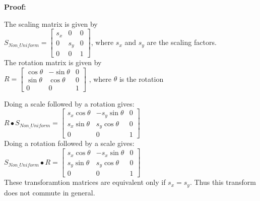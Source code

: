 \documentclass[a4paper,10pt]{scrartcl}
\begin{document}
{\bfseries Proof:}

The scaling matrix is given by \\

$S_{Non\_Uniform} = \begin{bmatrix}
    s_x       & 0 & 0 \\
    0       & s_y & 0 \\
    0       & 0 & 1     
 \end{bmatrix}
$, where $s_x$ and $s_y$ are the scaling factors. \\

The rotation matrix is given by \\

$R = \begin{bmatrix}
      \cos{\theta}       & -\sin{\theta} & 0 \\
      \sin{\theta}       & \cos{\theta} & 0 \\
      0       & 0 & 1             
     \end{bmatrix}
$   , where $\theta$ is the rotation

Doing a scale followed by a rotation gives: \\

$R \bullet S_{Non\_Uniform} = \begin{bmatrix}
		  s_x\cos{\theta} & -s_y\sin{\theta} & 0 \\
		  s_x\sin{\theta} & s_y\cos{\theta} & 0 \\
		  0 & 0 & 1
               \end{bmatrix}
$ \\


Doing a rotation followed by a scale gives: \\

$S_{Non\_Uniform} \bullet R = \begin{bmatrix}
		  s_x\cos{\theta} & -s_x\sin{\theta} & 0 \\
		  s_y\sin{\theta} & s_y\cos{\theta} & 0 \\
		  0 & 0 & 1
               \end{bmatrix}
$ \\

These transforamtion matrices are equivalent only if $s_x = s_y$. Thus this transform does not commute in general.
\end{document}
